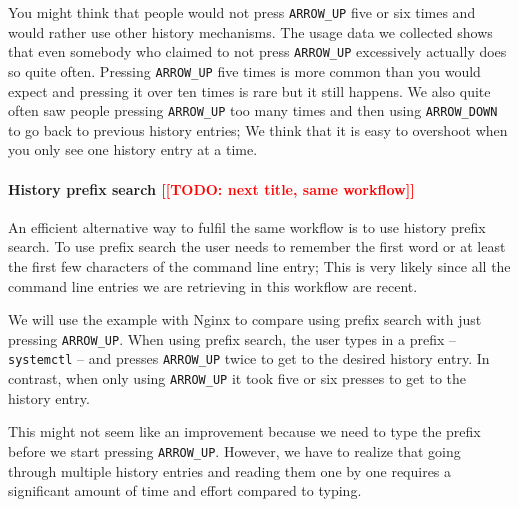 \documentclass[thesis=M,english]{FITthesis}[2012/10/20]
\newcommand{\redtext}[1]{\textcolor{red}{[[#1]]}}
\begin{document}
You might think that people would not press \verb|ARROW_UP| five or six times and would rather use other history mechanisms.
The usage data we collected shows that even somebody who claimed to not press \verb|ARROW_UP| excessively actually does so quite often. Pressing \verb|ARROW_UP| five times is more common than you would expect and pressing it over ten times is rare but it still happens. We also quite often saw people pressing \verb|ARROW_UP| too many times and then using \verb|ARROW_DOWN| to go back to previous history entries; We think that it is easy to overshoot when you only see one history entry at a time.




\paragraph{History prefix search \redtext{TODO: next title, same workflow}}

An efficient alternative way to fulfil the same workflow is to use history prefix search. To use prefix search the user needs to remember the first word or at least the first few characters of the command line entry; This is very likely since all the command line entries we are retrieving in this workflow are recent.

We will use the example with Nginx to compare using prefix search with just pressing \verb|ARROW_UP|. When using prefix search, the user types in a prefix -- \verb|systemctl| -- and presses \verb|ARROW_UP| twice to get to the desired history entry. In contrast, when only using \verb|ARROW_UP| it took five or six presses to get to the history entry.

This might not seem like an improvement because we need to type the prefix before we start pressing \verb|ARROW_UP|. However, we have to realize that going through multiple history entries and reading them one by one requires a significant amount of time and effort compared to typing. 
    
\end{document}
